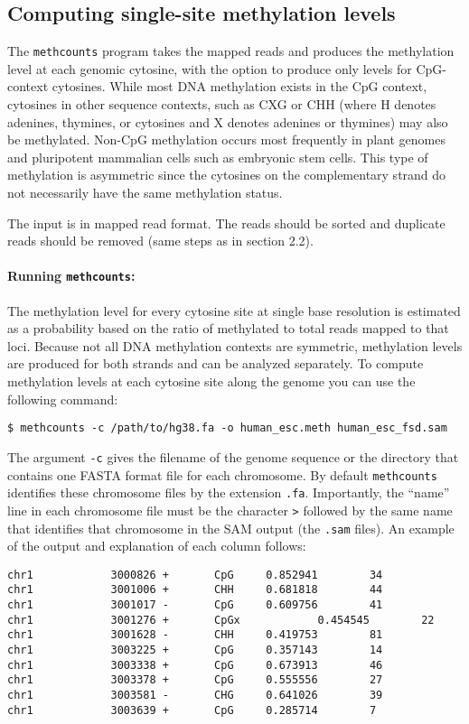 \documentclass[10pt]{article}
\newcommand{\prog}[1]{\texttt{#1}}
\newcommand{\fn}[1]{\texttt{#1}}
\newcommand{\lit}[1]{\texttt{#1}}
\newcommand{\op}[1]{\texttt{#1}}
\begin{document}
\subsection{Computing single-site methylation levels}
\label{sec:estim-methyl-freq}

The \prog{methcounts} program takes the mapped reads and produces the
methylation level at each genomic cytosine, with the option to produce
only levels for CpG-context cytosines.
While most DNA methylation exists in the CpG context, cytosines in
other sequence contexts, such as CXG or CHH (where H denotes adenines,
thymines, or cytosines and X denotes adenines or thymines) may also be
methylated. Non-CpG methylation occurs most frequently in plant genomes
and pluripotent mammalian cells such as embryonic stem cells. This type
of methylation is asymmetric since the cytosines on the complementary
strand do not necessarily have the same methylation status.

The input is in mapped read format. The reads should be sorted and
duplicate reads should be removed (same steps as in section 2.2). 

\paragraph{Running \prog{methcounts}:}
The methylation level for every cytosine site at single base resolution
is estimated as a probability based on the ratio of methylated to total
reads mapped to that loci. Because not all DNA methylation contexts are
symmetric, methylation levels are produced for both strands and can be
analyzed separately. To compute methylation levels at each
cytosine site along the genome you can use the following command:

\begin{verbatim}
$ methcounts -c /path/to/hg38.fa -o human_esc.meth human_esc_fsd.sam
\end{verbatim}

The argument \op{-c} gives the filename of the genome sequence or the
directory that contains one FASTA format file for each chromosome. By
default \prog{methcounts} identifies these chromosome files by the
extension \fn{.fa}. Importantly, the ``name'' line in each chromosome
file must be the character \lit{>} followed by the same name that
identifies that chromosome in the SAM output (the \fn{.sam}
files). An example of the output and explanation of each column follows:

{\small{%
\begin{verbatim}
chr1            3000826 +       CpG     0.852941        34
chr1            3001006 +       CHH     0.681818        44
chr1            3001017 -       CpG     0.609756        41
chr1            3001276 +       CpGx            0.454545        22
chr1            3001628 -       CHH     0.419753        81
chr1            3003225 +       CpG     0.357143        14
chr1            3003338 +       CpG     0.673913        46
chr1            3003378 +       CpG     0.555556        27
chr1            3003581 -       CHG     0.641026        39
chr1            3003639 +       CpG     0.285714        7
\end{verbatim}%
}}
\end{document}
